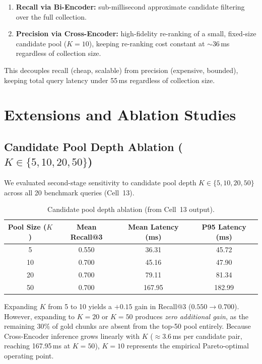 \documentclass[11pt,a4paper]{article}
\begin{document}
\begin{enumerate}[nosep]
    \item \textbf{Recall via Bi-Encoder:} sub-millisecond approximate
          candidate filtering over the full collection.
    \item \textbf{Precision via Cross-Encoder:} high-fidelity re-ranking of a
          small, fixed-size candidate pool ($K{=}10$), keeping re-ranking cost
          constant at $\sim$36\,ms regardless of collection size.
\end{enumerate}

This decouples recall (cheap, scalable) from precision (expensive, bounded),
keeping total query latency under 55\,ms regardless of collection size.


\section{Extensions and Ablation Studies}
\label{sec:extensions}

\subsection{Candidate Pool Depth Ablation ($K \in \{5, 10, 20, 50\}$)}

We evaluated second-stage sensitivity to candidate pool depth $K \in \{5, 10, 20, 50\}$ across all 20 benchmark queries (Cell~13).

\begin{table}[H]
\centering
\small
\caption{Candidate pool depth ablation (from Cell~13 output).}
\label{tab:ablation}
\begin{tabular}{@{}cccc@{}}
\toprule
\textbf{Pool Size ($K$)} & \textbf{Mean Recall@3} & \textbf{Mean Latency (ms)} & \textbf{P95 Latency (ms)} \\
\midrule
5  & 0.550 & 36.31 & 45.72 \\
10 & 0.700 & 45.16 & 47.90 \\
20 & 0.700 & 79.11 & 81.34 \\
50 & 0.700 & 167.95 & 182.99 \\
\bottomrule
\end{tabular}
\end{table}

\noindent
Expanding $K$ from 5 to 10 yields a $+0.15$ gain in Recall@3 ($0.550 \to 0.700$). However, expanding to $K=20$ or $K=50$ produces \emph{zero additional gain}, as the remaining 30\% of gold chunks are absent from the top-50 pool entirely. Because Cross-Encoder inference grows linearly with $K$ ($\approx 3.6$\,ms per candidate pair, reaching 167.95\,ms at $K=50$), $K=10$ represents the empirical Pareto-optimal operating point.
\end{document}

